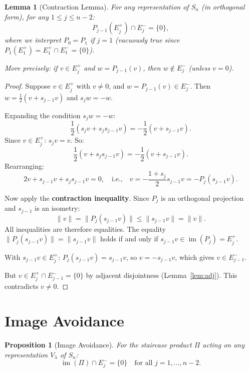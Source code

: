 \documentclass[11pt]{article}
\newtheorem{lemma}[theorem]{Lemma}
\newtheorem{proposition}[theorem]{Proposition}
\theoremstyle{definition}
\theoremstyle{remark}
\newcommand{\im}{\operatorname{im}}
\begin{document}
\begin{lemma}[Contraction Lemma]\label{lem:contraction}
For any representation of $S_n$ (in orthogonal form), for any $1 \leq j \leq n-2$:
\[
P_{j-1}(E_j^+) \cap E_j^- = \{0\},
\]
where we interpret $P_0 = P_1$ if $j=1$ (vacuously true since $P_1(E_1^+) = E_1^+ \cap E_1^- = \{0\}$).

More precisely: if $v \in E_j^+$ and $w = P_{j-1}(v)$, then $w \notin E_j^-$
(unless $v = 0$).
\end{lemma}

\begin{proof}
Suppose $v \in E_j^+$ with $v \neq 0$, and $w = P_{j-1}(v) \in E_j^-$.
Then $w = \frac{1}{2}(v + s_{j-1} v)$ and $s_j w = -w$.

Expanding the condition $s_j w = -w$:
\[
\frac{1}{2}(s_j v + s_j s_{j-1} v) = -\frac{1}{2}(v + s_{j-1} v).
\]
Since $v \in E_j^+$: $s_j v = v$. So:
\[
\frac{1}{2}(v + s_j s_{j-1} v) = -\frac{1}{2}(v + s_{j-1} v).
\]
Rearranging:
\[
2v + s_{j-1} v + s_j s_{j-1} v = 0,
\quad\text{i.e.,}\quad
v = -\frac{1+s_j}{2} s_{j-1} v = -P_j(s_{j-1} v).
\]

Now apply the \textbf{contraction inequality}. Since $P_j$ is an
orthogonal projection and $s_{j-1}$ is an isometry:
\[
\|v\| = \|P_j(s_{j-1} v)\| \leq \|s_{j-1} v\| = \|v\|.
\]
All inequalities are therefore equalities. The equality
$\|P_j(s_{j-1} v)\| = \|s_{j-1} v\|$ holds if and only if
$s_{j-1} v \in \im(P_j) = E_j^+$.

With $s_{j-1} v \in E_j^+$: $P_j(s_{j-1} v) = s_{j-1} v$, so
$v = -s_{j-1} v$, which gives $v \in E_{j-1}^-$.

But $v \in E_j^+ \cap E_{j-1}^- = \{0\}$ by adjacent disjointness
(Lemma~\ref{lem:adj}). This contradicts $v \neq 0$.
\end{proof}

\section{Image Avoidance}

\begin{proposition}[Image Avoidance]\label{prop:avoidance}
For the staircase product $\Pi$ acting on any representation $V_\lambda$
of $S_n$:
\[
\im(\Pi) \cap E_j^- = \{0\} \quad \text{for all } j = 1, \ldots, n-2.
\]
\end{proposition}
\end{document}
